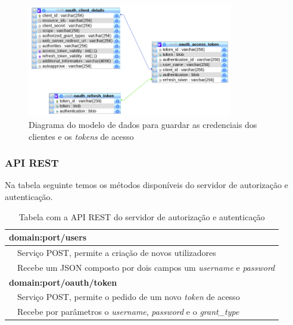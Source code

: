  \begin{figure}[H]
  \centering
  \includegraphics[width=0.8\textwidth]{imgs/auth-diagram.png}
  \caption[Diagrama do modelo de dados para guardar as credenciais dos clientes e os  \textit{tokens} de acesso]{Diagrama do modelo de dados para guardar as credenciais dos clientes e os  \textit{tokens} de acesso}
  
  \label{f:auth-diagram}
\end{figure}

\subsubsection{API REST}
\label{l:restapiAUTH}
Na tabela seguinte temos os métodos disponíveis do servidor de autorização e autenticação.
\begin{table}[H]
\label{t:apirest-auth}
\centering
\begin{tabularx}{1\textwidth}{|p{0.3cm} p{14.4cm}|}
\multicolumn{2}{l}{\textbf{domain:port/users}}  \\ \hline 
 & Serviço POST, permite a criação de novos utilizadores \\
 & Recebe um JSON composto por dois campos um  \textit{username} e  \textit{password} \\ \hline
\multicolumn{2}{l}{\textbf{domain:port/oauth/token}} \\ \hline
 & Serviço POST, permite o pedido de um novo  \textit{token} de acesso \\
 & Recebe por parâmetros o  \textit{username},  \textit{password} e o  \textit{grant\_type} \\ \hline
\end{tabularx}
\caption{Tabela com a API REST do servidor de autorização e autenticação}
\end{table}

